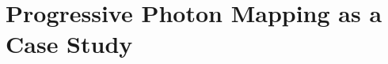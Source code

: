 \documentclass[main.tex]{subfiles}
\begin{document}
\chapter{Progressive Photon Mapping as a Case Study} \label{chapter:photon}
\end{document}
